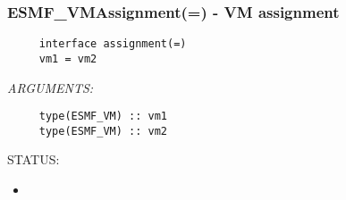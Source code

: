  
\setlength{\oldparskip}{\parskip}
\setlength{\parskip}{1.5ex}
\setlength{\oldparindent}{\parindent}
\setlength{\parindent}{0pt}
\setlength{\oldbaselineskip}{\baselineskip}
\setlength{\baselineskip}{11pt}
 
\def\bv{\begin{verbatim}}
\def\ev{\end{verbatim}}
\def\be{\begin{equation}}
\def\ee{\end{equation}}
\def\bea{\begin{eqnarray}}
\def\eea{\end{eqnarray}}
\def\bi{\begin{itemize}}
\def\ei{\end{itemize}}
\def\bn{\begin{enumerate}}
\def\en{\end{enumerate}}
\def\bd{\begin{description}}
\def\ed{\end{description}}
\def\({\left (}
\def\){\right )}
\def\[{\left [}
\def\]{\right ]}
\def\<{\left  \langle}
\def\>{\right \rangle}
\def\cI{{\cal I}}
\def\diag{\mathop{\rm diag}}
\def\tr{\mathop{\rm tr}}


 
\subsubsection [ESMF\_VMAssignment(=)] {ESMF\_VMAssignment(=) - VM assignment}


  
\begin{verbatim}     interface assignment(=)
     vm1 = vm2\end{verbatim}{\em ARGUMENTS:}
\begin{verbatim}     type(ESMF_VM) :: vm1
     type(ESMF_VM) :: vm2\end{verbatim}
{\sf STATUS:}
   \begin{itemize}
   \item{}
   \end{itemize}
  
